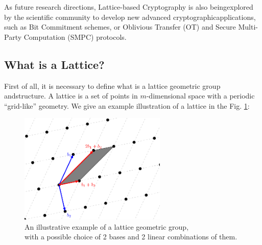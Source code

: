\documentclass[runningheads]{llncs}
\numberwithin{equation}{section}
\begin{document}
    As future research directions, Lattice-based Cryptography is also being\break explored by the scientific community to develop new advanced cryptographic\break applications, such as Bit Commitment schemes, or Oblivious Transfer (OT) \cite{peikert-vaikuntanathan-waters:framework-efficient-composable-oblivious-transfer:2008:06-2024,libert-et-al:adaptive-oblivious-transfer-with-access-control-lattice-assumptions:2017:06-2024} and Secure Multi-Party Computation (SMPC) \cite{bendlin-et-al:semi-homomorphic-encryption-and-multiparty-computation:2011:06-2024,gorbunov-vaikuntanathan-wee:functional-encryption-bounded-collusions-multi-party-computation:2012:06-2024,mukherjee-wichs:two-rounds-multiparty-computation-multi-key-fhe:2016:06-2024} protocols.
    
    
    \subsection{What is a Lattice?}
    \label{subsec:what-is-a-lattice}

    First of all, it is necessary to define what is a lattice geometric group and\break structure. A lattice is a set of points in $m$-dimensional space with a periodic ``grid-like'' geometry. We give an example illustration of a lattice in the Fig. \ref{fig:lattice-structure-illustrative-example}: 

    \vspace{-2ex}
    \begin{figure}[!ht]
        \centering
        \captionsetup{justification=centering}
        \includegraphics[width=0.625\textwidth]{figures/sections/section-2/lattice-structure-illustrative-example.pdf}
        \caption{An illustrative example of a lattice geometric group,\\ with a possible choice of 2 bases and 2 linear combinations of them.}
        \label{fig:lattice-structure-illustrative-example}
    \end{figure}
    
\end{document}

